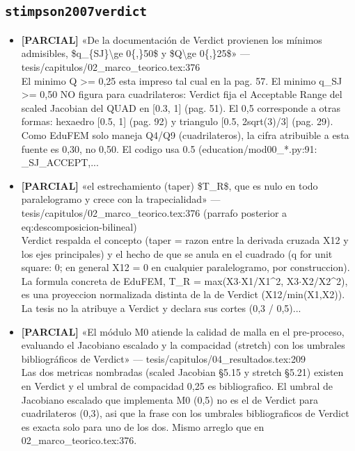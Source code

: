 \documentclass[11pt,a4paper]{article}
\newcommand{\campo}[1]{\textcolor{gris}{\footnotesize #1}}
\begin{document}
\subsection{\texttt{stimpson2007verdict}}
\begin{itemize}\small
\item \textbf{[PARCIAL]} «De la documentación de Verdict provienen los mínimos admisibles, \$q\_\{SJ\}\textbackslash{}ge 0\{,\}50\$ y \$Q\textbackslash{}ge 0\{,\}25\$» --- tesis/capitulos/02\_marco\_teorico.tex:376
\\ \campo{El minimo Q \textgreater{}= 0,25 esta impreso tal cual en la pag. 57. El minimo q\_SJ \textgreater{}= 0,50 NO figura para cuadrilateros: Verdict fija el Acceptable Range del scaled Jacobian del QUAD en [0.3, 1] (pag. 51). El 0,5 corresponde a otras formas: hexaedro [0.5, 1] (pag. 92) y triangulo [0.5, 2sqrt(3)/3] (pag. 29). Como EduFEM solo maneja Q4/Q9 (cuadrilateros), la cifra atribuible a esta fuente es 0,30, no 0,50. El codigo usa 0.5 (education/mod00\_*.py:91: \_SJ\_ACCEPT,...}
\item \textbf{[PARCIAL]} «el estrechamiento (taper) \$T\_R\$, que es nulo en todo paralelogramo y crece con la trapecialidad» --- tesis/capitulos/02\_marco\_teorico.tex:376 (parrafo posterior a eq:descomposicion-bilineal)
\\ \campo{Verdict respalda el concepto (taper = razon entre la derivada cruzada X12 y los ejes principales) y el hecho de que se anula en el cuadrado (q for unit square: 0; en general X12 = 0 en cualquier paralelogramo, por construccion). La formula concreta de EduFEM, T\_R = max(\textbar{}X3$\cdot$X1\textbar{}/\textbar{}\textbar{}X1\textbar{}\textbar{}\textasciicircum{}2, \textbar{}X3$\cdot$X2\textbar{}/\textbar{}\textbar{}X2\textbar{}\textbar{}\textasciicircum{}2), es una proyeccion normalizada distinta de la de Verdict (\textbar{}\textbar{}X12\textbar{}\textbar{}/min(\textbar{}\textbar{}X1\textbar{}\textbar{},\textbar{}\textbar{}X2\textbar{}\textbar{})). La tesis no la atribuye a Verdict y declara sus cortes (0,3 / 0,5)...}
\item \textbf{[PARCIAL]} «El módulo M0 atiende la calidad de malla en el pre-proceso, evaluando el Jacobiano escalado y la compacidad (stretch) con los umbrales bibliográficos de Verdict» --- tesis/capitulos/04\_resultados.tex:209
\\ \campo{Las dos metricas nombradas (scaled Jacobian §5.15 y stretch §5.21) existen en Verdict y el umbral de compacidad 0,25 es bibliografico. El umbral de Jacobiano escalado que implementa M0 (0,5) no es el de Verdict para cuadrilateros (0,3), asi que la frase \textquotedbl{}con los umbrales bibliograficos de Verdict\textquotedbl{} es exacta solo para uno de los dos. Mismo arreglo que en 02\_marco\_teorico.tex:376.}
\end{itemize}
\end{document}
